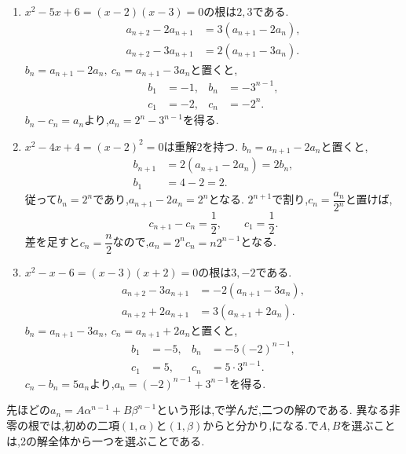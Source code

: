 \noindent{}\par\nobreak
\begin{enumerate}[label=(\arabic*),parsep=3pt,format=\bookitemlink{example-three-term-1}{solution}{problem}]
  \item {}$x^2-5x+6=(x-2)(x-3)=0$の根は$2,3$である.
    \begin{align*}
      a_{n+2}-2a_{n+1}&=3(a_{n+1}-2a_n),\\
      a_{n+2}-3a_{n+1}&=2(a_{n+1}-3a_n).
    \end{align*}
    $b_n=a_{n+1}-2a_n,\ c_n=a_{n+1}-3a_n$と置くと,
    \[
      \begin{aligned}
        b_1&=-1,& b_n&=-3^{n-1},\\
        c_1&=-2,& c_n&=-2^n.
      \end{aligned}
    \]
    $b_n-c_n=a_n$より,$a_n=2^n-3^{n-1}$を得る.
  \item {}$x^2-4x+4=(x-2)^2=0$は重解$2$を持つ.
    $b_n=a_{n+1}-2a_n$と置くと,
    \[
      \begin{aligned}
        b_{n+1}&=2(a_{n+1}-2a_n)=2b_n,\\
        b_1&=4-2=2.
      \end{aligned}
    \]
    従って$b_n=2^n$であり,$a_{n+1}-2a_n=2^n$となる.
    $2^{n+1}$で割り,$c_n=\dfrac{a_n}{2^n}$と置けば,
    \[
      c_{n+1}-c_n=\frac12,\qquad c_1=\frac12.
    \]
    差を足すと$c_n=\dfrac{n}{2}$なので,$a_n=2^nc_n=n2^{n-1}$となる.
  \item {}$x^2-x-6=(x-3)(x+2)=0$の根は$3,-2$である.
    \begin{align*}
      a_{n+2}-3a_{n+1}&=-2(a_{n+1}-3a_n),\\
      a_{n+2}+2a_{n+1}&=3(a_{n+1}+2a_n).
    \end{align*}
    $b_n=a_{n+1}-3a_n,\ c_n=a_{n+1}+2a_n$と置くと,
    \[
      \begin{aligned}
        b_1&=-5,& b_n&=-5(-2)^{n-1},\\
        c_1&=5,& c_n&=5\cdot3^{n-1}.
      \end{aligned}
    \]
    $c_n-b_n=5a_n$より,$a_n=(-2)^{n-1}+3^{n-1}$を得る.
\end{enumerate}

\label{解釈：三項間と解全体}
先ほどの$a_n=A\alpha^{n-1}+B\beta^{n-1}$という形は,で学んだ,二つの解のである.
異なる非零の根では,初めの二項$(1,\alpha)$と$(1,\beta)$からと分かり,になる.で$A,B$を選ぶことは,2の解全体から一つを選ぶことである.

